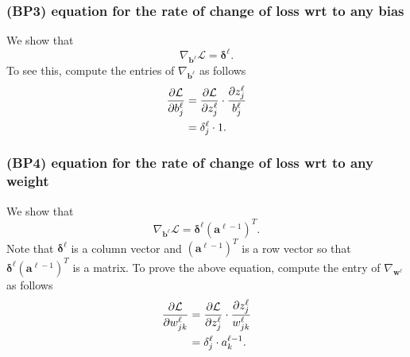 \documentclass[12pt]{article}
\renewcommand{\a}{\boldsymbol{a}}
\renewcommand{\b}{\boldsymbol{b}}
\newcommand{\w}{\boldsymbol{w}}
\newcommand{\bdelta}{\boldsymbol{\delta}}
\newcommand{\cL}{\mathcal{L}}
\begin{document}
\subsubsection*{(BP3) equation for the rate of change of loss wrt to any bias}

We show that
\begin{equation}
\nabla_{\b^\ell} \cL = \bdelta^\ell.
\end{equation}
To see this, compute the entries of $\nabla_{\b^\ell}$ as follows
\begin{align}
{\partial \cL \over \partial b^\ell_j} 
&=
{\partial \cL \over \partial z^\ell_j} \cdot {\partial z^\ell_j \over b^\ell_j} \\
&=
\delta^\ell_j \cdot 1. 
\end{align}

\subsubsection*{(BP4) equation for the rate of change of loss wrt to any weight}

We show that 
\begin{equation}
\nabla_{\b^\ell} \cL = \bdelta^\ell (\a^{\ell-1})^T.
\end{equation}
Note that $\bdelta^\ell$ is a column vector and $(\a^{\ell-1})^T$ is a row vector so that $\bdelta^\ell (\a^{\ell-1})^T$ is a matrix.
To prove the above equation, compute the entry of $\nabla_{\w^\ell}$ as follows
\begin{align}
{\partial \cL \over \partial w^\ell_{jk}} 
&=
{\partial \cL \over \partial z^\ell_j} \cdot {\partial z^\ell_j \over w^\ell_{jk}} \\
&=
\delta^\ell_j \cdot a^{\ell-1}_k.
\end{align}
\end{document}
